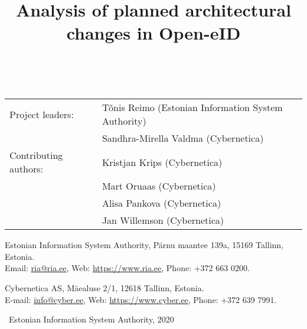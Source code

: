 \documentclass[en-lang,rdf-logo]{cyber-technical}
\begin{document}
	\title{Analysis of planned architectural changes in Open-eID}

	\maketitle

~

\vfill

\begin{tabular}{ll}
Project leaders:		& Tõnis Reimo (Estonian Information System Authority)\\
						& Sandhra-Mirella Valdma (Cybernetica)\\
Contributing authors: 	& Kristjan Krips (Cybernetica)\\
						& Mart Oruaas (Cybernetica)\\
						& Alisa Pankova (Cybernetica)\\
						& Jan Willemson (Cybernetica)\\
\end{tabular}

Estonian Information System Authority, Pärnu maantee 139a, 15169 Tallinn, Estonia.\\
Email: \href{mailto:ria@ria.ee}{ria@ria.ee}, Web: \url{https://www.ria.ee},
Phone: +372 663 0200.

Cybernetica AS, Mäealuse 2/1, 12618 Tallinn, Estonia.\\
E-mail: \href{mailto:info@cyber.ee}{info@cyber.ee}, Web: \url{https://www.cyber.ee},
Phone: +372 639 7991.

\textcopyright~Estonian Information System Authority, 2020

\clearpage 

	\setcounter{tocdepth}{3}
	\tableofcontents{}

	\cleardoublepage

	
	
	
	
	
	
	
	

	\appendix

	




\end{document}
